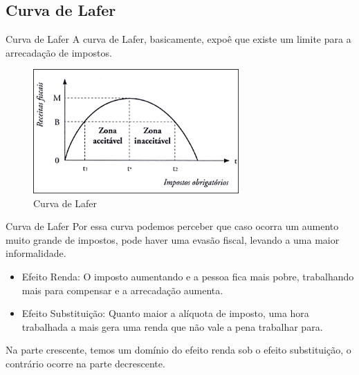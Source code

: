 \documentclass[xcolor=dvipsnames]{beamer}
\begin{document}
\subsection{Curva de Lafer}
\begin{frame}{Curva de Lafer}
A curva de Lafer, basicamente, expoê que existe um limite para a arrecadação de impostos. 
\begin{figure}
    \centering
    \includegraphics[width=0.70\textwidth]{84c4cf1024e60fe5773b5d4ef2615d8b.png}
    \caption{Curva de Lafer}
    \label{fig:my_label}
\end{figure}
\end{frame}
\begin{frame}{Curva de Lafer}
Por essa curva podemos perceber que caso ocorra um aumento muito grande de impostos, pode haver uma evasão fiscal, levando a uma maior informalidade.
\begin{itemize}
    \item Efeito Renda: O imposto aumentando e a pessoa fica mais pobre, trabalhando mais para compensar e a arrecadação aumenta. 
    \item Efeito Substituição: Quanto maior a alíquota de imposto, uma hora trabalhada a mais gera uma renda que não vale a pena trabalhar para. 
\end{itemize}
Na parte crescente, temos um domínio do efeito renda sob o efeito substituição, o contrário ocorre na parte decrescente. 
\end{frame}
\end{document}
